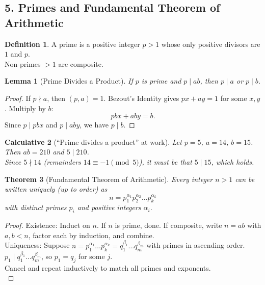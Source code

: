 \documentclass[12pt]{article}
\newtheorem{theorem}{Theorem}
\newtheorem{lemma}[theorem]{Lemma}
\newtheorem{calculative}[theorem]{Calculative}
\theoremstyle{definition}
\newtheorem{definition}{Definition}
\begin{document}
\newpage

\subsection*{5. Primes and Fundamental Theorem of Arithmetic}

\begin{definition}
A prime is a positive integer $p>1$ whose only positive divisors are $1$ and $p$. \\

\noindent
Non-primes $>1$ are composite.
\end{definition}

\dotfill

\begin{lemma}[Prime Divides a Product]
If $p$ is prime and $p\mid ab$, then $p\mid a$ or $p\mid b$.
\end{lemma}

\vspace{1em}

\begin{proof}
If $p\nmid a$, then $(p,a)=1$. Bezout's Identity gives $px+ay=1$ for some $x,y$. Multiply by $b$:
\[
pbx + aby = b.
\]
Since $p\mid pbx$ and $p\mid ab y$, we have $p\mid b$.
\end{proof}

\dotfill

\begin{calculative}[“Prime divides a product” at work]

\noindent
Let $p=5$, $a=14$, $b=15$. Then $ab=210$ and $5\mid 210$. \\

\noindent
Since $5\nmid 14$ (remainders $14\equiv -1\pmod 5$), it must be that $5\mid 15$, which holds.
\end{calculative}

\dotfill

\begin{theorem}[Fundamental Theorem of Arithmetic]
Every integer $n>1$ can be written uniquely (up to order) as
\[
n = p_1^{\alpha_1} p_2^{\alpha_2} \dots p_k^{\alpha_k}
\]
with distinct primes $p_i$ and positive integers $\alpha_i$.
\end{theorem}

\vspace{1em}

\begin{proof}
Existence: Induct on $n$. If $n$ is prime, done. If composite, write $n=ab$ with $a,b<n$, factor each by induction, and combine.\\


\noindent
Uniqueness: Suppose $n = p_1^{\alpha_1}\dots p_k^{\alpha_k} = q_1^{\beta_1}\dots q_m^{\beta_m}$ with primes in ascending order. $p_1\mid q_1^{\beta_1}\dots q_m^{\beta_m}$, so $p_1=q_j$ for some $j$. \\

\noindent
Cancel and repeat inductively to match all primes and exponents.\\
\end{proof}
\end{document}
